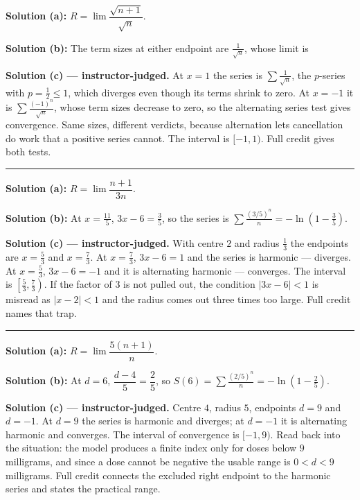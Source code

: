 \documentclass[12pt]{article}
\begin{document}
\textbf{Solution (a):} $R = \lim \dfrac{\sqrt{n+1}}{\sqrt{n}}$. 

\textbf{Solution (b):} The term sizes at either endpoint are $\frac{1}{\sqrt{n}}$, whose limit is 

\textbf{Solution (c) --- instructor-judged.} At $x = 1$ the series is $\sum \frac{1}{\sqrt{n}}$, the $p$-series with $p = \frac12 \le 1$, which diverges even though its terms shrink to zero. At $x = -1$ it is $\sum \frac{(-1)^n}{\sqrt{n}}$, whose term sizes decrease to zero, so the alternating series test gives convergence. Same sizes, different verdicts, because alternation lets cancellation do work that a positive series cannot. The interval is $[-1, 1)$. Full credit gives both tests.

\vspace{0.2cm}\noindent\rule{\linewidth}{0.2pt}\vspace{0.2cm}


\textbf{Solution (a):} $R = \lim \dfrac{n+1}{3n}$. 

\textbf{Solution (b):} At $x = \frac{11}{5}$, $3x - 6 = \frac{3}{5}$, so the series is $\sum \frac{(3/5)^n}{n} = -\ln\left(1 - \tfrac35\right)$. 

\textbf{Solution (c) --- instructor-judged.} With centre $2$ and radius $\frac13$ the endpoints are $x = \frac53$ and $x = \frac73$. At $x = \frac73$, $3x - 6 = 1$ and the series is harmonic --- diverges. At $x = \frac53$, $3x - 6 = -1$ and it is alternating harmonic --- converges. The interval is $\left[\frac53, \frac73\right)$. If the factor of $3$ is not pulled out, the condition $|3x-6| < 1$ is misread as $|x-2| < 1$ and the radius comes out three times too large. Full credit names that trap.

\vspace{0.2cm}\noindent\rule{\linewidth}{0.2pt}\vspace{0.2cm}


\textbf{Solution (a):} $R = \lim \dfrac{5(n+1)}{n}$. 

\textbf{Solution (b):} At $d = 6$, $\dfrac{d-4}{5} = \dfrac{2}{5}$, so $S(6) = \sum \frac{(2/5)^n}{n} = -\ln\left(1 - \tfrac25\right)$. 

\textbf{Solution (c) --- instructor-judged.} Centre $4$, radius $5$, endpoints $d = 9$ and $d = -1$. At $d = 9$ the series is harmonic and diverges; at $d = -1$ it is alternating harmonic and converges. The interval of convergence is $[-1, 9)$. Read back into the situation: the model produces a finite index only for doses below $9$ milligrams, and since a dose cannot be negative the usable range is $0 < d < 9$ milligrams. Full credit connects the excluded right endpoint to the harmonic series and states the practical range.
\end{document}
